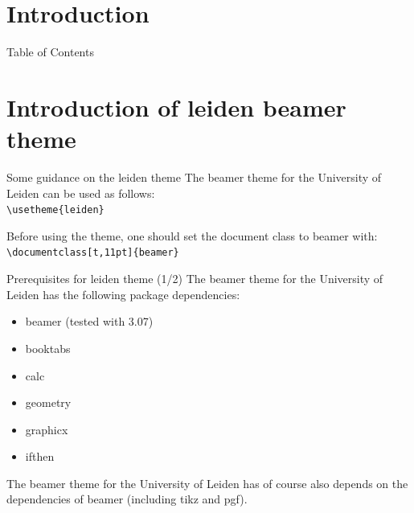 \documentclass[t,11pt]{beamer}
\subtitle{Template to generate Leiden-style slides with LaTeX}
\date{December 9th, 2010}
\title{\insertlecture}
\author{dr.~Joost Schalken}
\institute{Universiteit Leiden}
\begin{document}
\nonstopmode %


\section*{Introduction}

{
\begin{frame}[plain]
  \maketitle
\end{frame}
\addtocounter{framenumber}{-1}%
}

\begin{frame}{Table of Contents}
  \tableofcontents[sectionstyle=show/show, hideallsubsections]
\end{frame}


\section{Introduction of leiden beamer theme}

\begin{frame}[fragile]{Some guidance on the leiden theme}
The beamer theme for the University of Leiden can be used as follows:\\
\verb|\usetheme{leiden}|\\
\vspace{\baselineskip}

Before using the theme, one should set the document class to beamer
with:\\
\verb|\documentclass[t,11pt]{beamer}|
\end{frame}

\begin{frame}[fragile]{Prerequisites for leiden theme (1/2)}
The beamer theme for the University of Leiden has the following
package dependencies:
\begin{itemize}
\item	beamer (tested with 3.07)
\item   booktabs
\item	calc
\item	geometry
\item	graphicx
\item	ifthen
\end{itemize}
\vspace{\baselineskip}

The beamer theme for the University of Leiden has of course also
depends on the dependencies of beamer (including tikz and pgf).
\end{frame}
\end{document}
